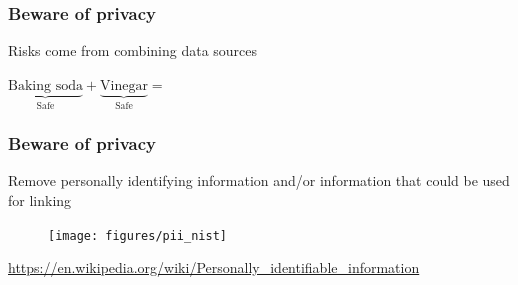 \documentclass[aspectratio=169]{beamer}
\begin{document}
\begin{frame}
\frametitle{Beware of privacy}
\pause

Risks come from combining data sources\\
\vfill
\begin{minipage}[c]{0.35\textwidth}
$\underbrace{\text{Baking soda}}_{\text{Safe}} + \underbrace{\text{Vinegar}}_{\text{Safe}} =$
\end{minipage}
\hspace{0.05\textwidth}
\begin{minipage}[c]{0.55\textwidth}
\end{minipage}

\end{frame}
\begin{frame}
\frametitle{Beware of privacy}

Remove personally identifying information and/or information that could be used for linking

\begin{figure}
  \centering
  \texttt{[image: figures/pii\_nist]}
\end{figure}

\vfill
\url{https://en.wikipedia.org/wiki/Personally_identifiable_information}

\end{frame}
\end{document}
